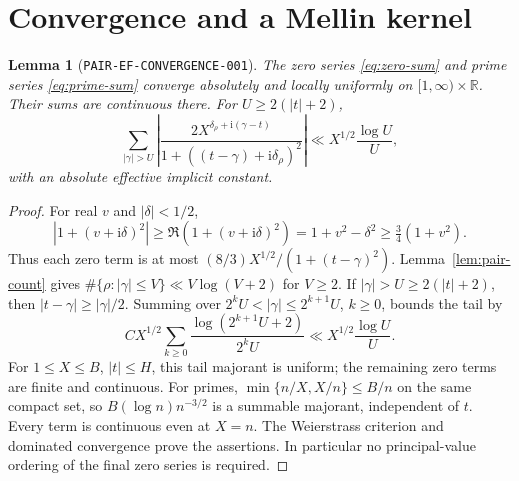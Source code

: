 \documentclass[11pt]{article}
\newtheorem{lemma}{Lemma}
\newcommand{\ii}{\mathrm i}
\begin{document}
\section{Convergence and a Mellin kernel}

\begin{lemma}[\texttt{PAIR-EF-CONVERGENCE-001}]
\label{lem:ef-convergence}
The zero series \eqref{eq:zero-sum} and prime series
\eqref{eq:prime-sum} converge absolutely and locally uniformly on
\([1,\infty)\times\mathbb R\). Their sums are continuous there.
For \(U\geq2(|t|+2)\),
\begin{equation}\label{eq:zero-tail}
 \sum_{|\gamma|>U}
 \left|\frac{2X^{\delta_\rho+\ii(\gamma-t)}}
 {1+((t-\gamma)+\ii\delta_\rho)^2}\right|
 \ll X^{1/2}\frac{\log U}{U},
\end{equation}
with an absolute effective implicit constant.
\end{lemma}
\begin{proof}
For real \(v\) and \(|\delta|<1/2\),
\begin{equation}\label{eq:denominator}
 |1+(v+\ii\delta)^2|
 \geq\Re(1+(v+\ii\delta)^2)
 =1+v^2-\delta^2\geq\tfrac34(1+v^2).
\end{equation}
Thus each zero term is at most \((8/3)X^{1/2}/(1+(t-\gamma)^2)\).
Lemma~\ref{lem:pair-count} gives
\(\#\{\rho:|\gamma|\leq V\}\ll V\log(V+2)\) for \(V\geq2\).
If \(|\gamma|>U\geq2(|t|+2)\), then
\(|t-\gamma|\geq|\gamma|/2\). Summing over
\(2^kU<|\gamma|\leq2^{k+1}U\), \(k\geq0\), bounds the tail by
\[
 C X^{1/2}\sum_{k\geq0}
 \frac{\log(2^{k+1}U+2)}{2^kU}
 \ll X^{1/2}\frac{\log U}{U}.
\]
For \(1\leq X\leq B\), \(|t|\leq H\), this tail majorant is
uniform; the remaining zero terms are finite and continuous.
For primes, \(\min\{n/X,X/n\}\leq B/n\) on the same compact set,
so \(B(\log n)n^{-3/2}\) is a summable majorant, independent of \(t\).
Every term is continuous even at \(X=n\). The Weierstrass criterion
and dominated convergence prove the assertions. In particular no
principal-value ordering of the final zero series is required.
\end{proof}
\end{document}
